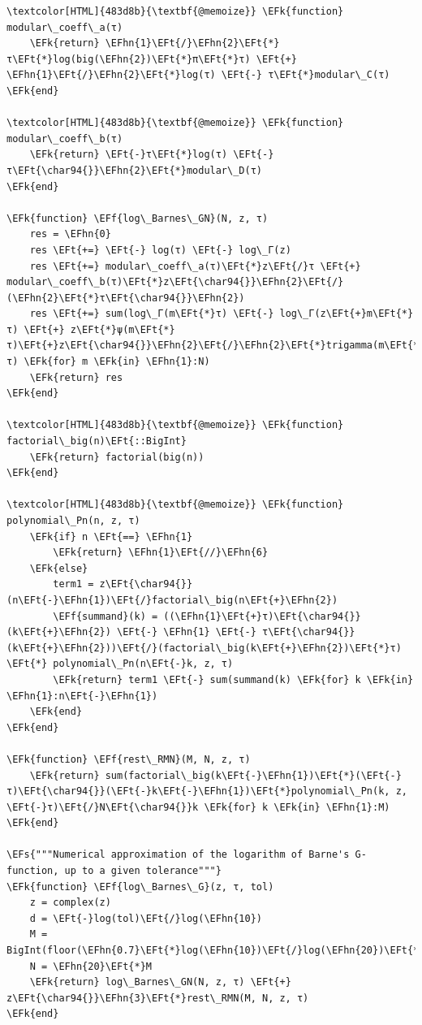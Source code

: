 \documentclass[a4paper]{article}
\numberwithin{equation}{section}
\newcommand{\EFs}[1]{\textcolor{EFs}{#1}} %
\newcommand{\EFk}[1]{\textcolor{EFk}{#1}} %
\newcommand{\EFf}[1]{\textcolor{EFf}{#1}} %
\newcommand{\EFt}[1]{\textcolor{EFt}{#1}} %
\newcommand{\EFhn}[1]{\textcolor{EFhn}{#1}} %
\begin{document}
\begin{Code}
\begin{Verbatim}
\textcolor[HTML]{483d8b}{\textbf{@memoize}} \EFk{function} modular\_coeff\_a(τ)
    \EFk{return} \EFhn{1}\EFt{/}\EFhn{2}\EFt{*}τ\EFt{*}log(big(\EFhn{2})\EFt{*}π\EFt{*}τ) \EFt{+} \EFhn{1}\EFt{/}\EFhn{2}\EFt{*}log(τ) \EFt{-} τ\EFt{*}modular\_C(τ)
\EFk{end}

\textcolor[HTML]{483d8b}{\textbf{@memoize}} \EFk{function} modular\_coeff\_b(τ)
    \EFk{return} \EFt{-}τ\EFt{*}log(τ) \EFt{-} τ\EFt{\char94{}}\EFhn{2}\EFt{*}modular\_D(τ)
\EFk{end}

\EFk{function} \EFf{log\_Barnes\_GN}(N, z, τ)
    res = \EFhn{0}
    res \EFt{+=} \EFt{-} log(τ) \EFt{-} log\_Γ(z)
    res \EFt{+=} modular\_coeff\_a(τ)\EFt{*}z\EFt{/}τ \EFt{+} modular\_coeff\_b(τ)\EFt{*}z\EFt{\char94{}}\EFhn{2}\EFt{/}(\EFhn{2}\EFt{*}τ\EFt{\char94{}}\EFhn{2})
    res \EFt{+=} sum(log\_Γ(m\EFt{*}τ) \EFt{-} log\_Γ(z\EFt{+}m\EFt{*}τ) \EFt{+} z\EFt{*}ψ(m\EFt{*}τ)\EFt{+}z\EFt{\char94{}}\EFhn{2}\EFt{/}\EFhn{2}\EFt{*}trigamma(m\EFt{*}τ) \EFk{for} m \EFk{in} \EFhn{1}:N)
    \EFk{return} res
\EFk{end}

\textcolor[HTML]{483d8b}{\textbf{@memoize}} \EFk{function} factorial\_big(n)\EFt{::BigInt}
    \EFk{return} factorial(big(n))
\EFk{end}

\textcolor[HTML]{483d8b}{\textbf{@memoize}} \EFk{function} polynomial\_Pn(n, z, τ)
    \EFk{if} n \EFt{==} \EFhn{1}
        \EFk{return} \EFhn{1}\EFt{//}\EFhn{6}
    \EFk{else}
        term1 = z\EFt{\char94{}}(n\EFt{-}\EFhn{1})\EFt{/}factorial\_big(n\EFt{+}\EFhn{2})
        \EFf{summand}(k) = ((\EFhn{1}\EFt{+}τ)\EFt{\char94{}}(k\EFt{+}\EFhn{2}) \EFt{-} \EFhn{1} \EFt{-} τ\EFt{\char94{}}(k\EFt{+}\EFhn{2}))\EFt{/}(factorial\_big(k\EFt{+}\EFhn{2})\EFt{*}τ) \EFt{*} polynomial\_Pn(n\EFt{-}k, z, τ)
        \EFk{return} term1 \EFt{-} sum(summand(k) \EFk{for} k \EFk{in} \EFhn{1}:n\EFt{-}\EFhn{1})
    \EFk{end}
\EFk{end}

\EFk{function} \EFf{rest\_RMN}(M, N, z, τ)
    \EFk{return} sum(factorial\_big(k\EFt{-}\EFhn{1})\EFt{*}(\EFt{-}τ)\EFt{\char94{}}(\EFt{-}k\EFt{-}\EFhn{1})\EFt{*}polynomial\_Pn(k, z, \EFt{-}τ)\EFt{/}N\EFt{\char94{}}k \EFk{for} k \EFk{in} \EFhn{1}:M)
\EFk{end}

\EFs{"""Numerical approximation of the logarithm of Barne's G-function, up to a given tolerance"""}
\EFk{function} \EFf{log\_Barnes\_G}(z, τ, tol)
    z = complex(z)
    d = \EFt{-}log(tol)\EFt{/}log(\EFhn{10})
    M = BigInt(floor(\EFhn{0.7}\EFt{*}log(\EFhn{10})\EFt{/}log(\EFhn{20})\EFt{*}d))
    N = \EFhn{20}\EFt{*}M
    \EFk{return} log\_Barnes\_GN(N, z, τ) \EFt{+} z\EFt{\char94{}}\EFhn{3}\EFt{*}rest\_RMN(M, N, z, τ)
\EFk{end}


\end{Verbatim}
\end{Code}
\end{document}
